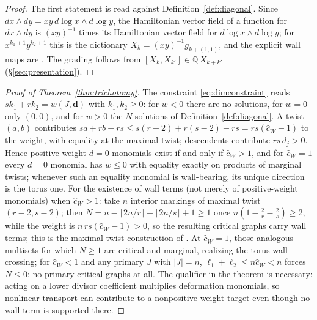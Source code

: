 \documentclass[11pt]{amsart}
\theoremstyle{definition}
\theoremstyle{remark}
\newcommand{\QQ}{\mathbb{Q}}
\newcommand{\chat}{\hat{c}}
\begin{document}
\begin{proof}
The first statement is \cite[Prop.~2.39(b)]{GKT} read against
Definition~\ref{def:diagonal}. Since $dx\wedge dy=xy\,d\log x\wedge d\log y$,
the Hamiltonian vector field of a function for $dx\wedge dy$ is $(xy)^{-1}$
times its Hamiltonian vector field for $d\log x\wedge d\log y$; for
$x^{k_1+1}y^{k_2+1}$ this is the dictionary $X_{k}=(xy)^{-1}g_{k+(1,1)}$, and
the explicit wall maps are \cite[Lem.~4.21]{GKT}.  The grading follows from
$[X_{k},X_{k'}]\in\QQ\,X_{k+k'}$ (\S\ref{sec:presentation}).
\end{proof}

\begin{proof}[Proof of Theorem~\ref{thm:trichotomy}]
The constraint \eqref{eq:dimconstraint} reads $sk_{1}+rk_{2}=w(J,\mathbf d)$ with
$k_{1},k_{2}\ge0$: for $w<0$ there are no solutions, for $w=0$ only $(0,0)$, and
for $w>0$ the $N$ solutions of Definition~\ref{def:diagonal}. A twist $(a,b)$
contributes $sa+rb-rs\le s(r{-}2)+r(s{-}2)-rs=rs(\chat_{W}-1)$ to the weight, with
equality at the maximal twist; descendents contribute $rs\,d_{j}>0$. Hence
positive-weight $d=0$ monomials exist if and only if $\chat_{W}>1$, and for
$\chat_{W}=1$ every $d=0$ monomial has $w\le0$ with equality exactly on products of
marginal twists; whenever such an equality monomial is wall-bearing, its unique
direction is the torus one. For the
existence of wall terms (not merely of positive-weight monomials) when
$\chat_{W}>1$: take $n$ interior markings of maximal twist $(r{-}2,s{-}2)$;
then $N=n-\lceil2n/r\rceil-\lceil2n/s\rceil+1\ge1$ once
$n(1-\tfrac2r-\tfrac2s)\ge2$, while the weight is $n\,rs(\chat_{W}-1)>0$, so
the resulting critical graphs carry wall terms; this is the maximal-twist
construction of \cite{note}. At $\chat_{W}=1$, those analogous multisets for
which $N\ge1$ are critical and marginal, realizing the torus wall-crossing; for
$\chat_{W}<1$ and any primary $J$ with $|J|=n$,
$\ell_{1}+\ell_{2}\le n\chat_{W}<n$ forces $N\le0$: no primary critical graphs
at all. The qualifier in the theorem is necessary: acting on a lower divisor
coefficient multiplies deformation monomials, so nonlinear transport can
contribute to a nonpositive-weight target even though no wall term is supported there.
\end{proof}
\end{document}
